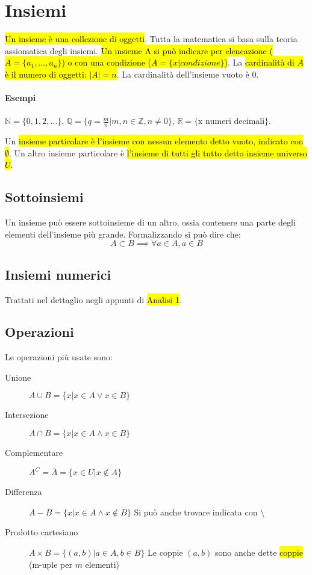 \section{Insiemi}
\hl{Un insieme è una collezione di oggetti}. Tutta la matematica si basa
sulla teoria assiomatica degli insiemi. \hl{Un insieme A si può indicare
per elencazione ($A = \{a_1, \dots, a_n\}$) o con una condizione
($A = \{x|\textit{condizione}\}$)}. La \hl{cardinalità di $A$ è il numero di
oggetti: $|A| = n$}. La cardinalità dell'insieme vuoto è 0.

\paragraph{Esempi} $\mathbb{N} = \{0, 1, 2,\dots\}$,
$\mathbb{Q} = \{q = \frac{m}{n} | m,n \in \mathbb{Z}, n \neq 0\}$,
$\mathbb{R} = \{\text{x numeri decimali}\}$.

Un \hl{insieme particolare è l'insieme con nessun elemento detto vuoto, indicato
con $\emptyset$}. Un altro insieme particolare è \hl{l'insieme di tutti gli tutto
detto insieme universo $U$}.

\subsection{Sottoinsiemi}
Un insieme può essere sottoinsieme di un altro, ossia contenere una parte degli
elementi dell'insieme più grande. Formalizzando si può dire che:
\[
    A \subset B \implies \forall a \in A, a \in B
\]

\subsection{Insiemi numerici}
Trattati nel dettaglio negli appunti di \hl{Analisi 1}.

\subsection{Operazioni}
Le operazioni più usate sono:
\begin{description}
    \item[Unione] $A \cup B = \{x | x \in A \vee x \in B\}$
    \item[Intersezione] $A \cap B = \{x | x \in A \wedge x \in B\}$
    \item[Complementare] $A^C = \bar{A} = \{x \in U | x \notin A\}$
    \item[Differenza] $A - B = \{x | x \in A \wedge x \notin B\}$
        Si può anche trovare indicata con $ \setminus $
    \item[Prodotto cartesiano] $A \times B = \{(a,b) | a \in A, b \in B \}$
        Le coppie $(a,b)$ sono anche dette \hl{coppie} (m-uple per $m$ elementi)
\end{description}

